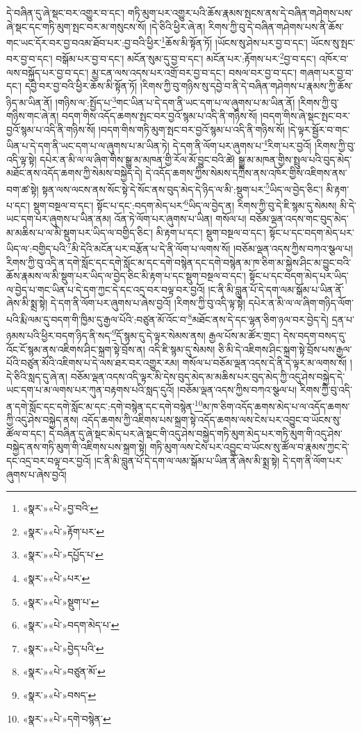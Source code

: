 དེ་བཞིན་དུ་ཞེ་སྡང་བར་འགྱུར་བ་དང་། གཏི་མུག་པར་འགྱུར་པའི་ཆོས་རྣམས་སྤངས་ནས་དེ་བཞིན་གཤེགས་པས་ཞེ་སྡང་དང་གཏི་མུག་སྤང་བར་མ་གསུངས་སོ། །དེ་ཅིའི་ཕྱིར་ཞེ་ན། རིགས་ཀྱི་བུ་དེ་བཞིན་གཤེགས་པས་ནི་ཆོས་གང་ཡང་དོར་བར་བྱ་བའམ་ཐོབ་པར་:བྱ་བའི་ཕྱིར་\footnote{«སྣར་»«པེ་»བྱ་བའི་}ཆོས་མི་སྟོན་ཏོ། །ཡོངས་སུ་ཤེས་པར་བྱ་བ་དང་། ཡོངས་སུ་སྤང་བར་བྱ་བ་དང་། བསྒོམ་པར་བྱ་བ་དང་། མངོན་སུམ་དུ་བྱ་བ་དང་། མངོན་པར་:རྟོགས་པར་\footnote{«སྣར་»«པེ་»རྟོག་པར་}བྱ་བ་དང་། འཁོར་བ་ལས་བསྐྱོད་པར་བྱ་བ་དང་། མྱ་ངན་ལས་འདས་པར་འགྲོ་བར་བྱ་བ་དང་། བསལ་བར་བྱ་བ་དང་། གཞག་པར་བྱ་བ་དང་། དབྱེ་བར་བྱ་བའི་ཕྱིར་ཆོས་མི་སྟོན་ཏོ། །རིགས་ཀྱི་བུ་གཉིས་སུ་དབྱེ་བ་ནི་དེ་བཞིན་གཤེགས་པ་རྣམས་ཀྱི་ཆོས་ཉིད་མ་ཡིན་ནོ། །གཉིས་ལ་:སྤྱོད་པ་\footnote{«སྣར་»«པེ་»དཔྱོད་པ་}གང་ཡིན་པ་དེ་དག་ནི་ཡང་དག་པ་ལ་ཞུགས་པ་མ་ཡིན་ནོ། །རིགས་ཀྱི་བུ་གཉིས་གང་ཞེ་ན། བདག་གིས་འདོད་ཆགས་སྤང་བར་བྱའོ་སྙམ་པ་འདི་ནི་གཉིས་སོ། །བདག་གིས་ཞེ་སྡང་སྤང་བར་བྱའོ་སྙམ་པ་འདི་ནི་གཉིས་སོ། །བདག་གིས་གཏི་མུག་སྤང་བར་བྱའོ་སྙམ་པ་འདི་ནི་གཉིས་སོ། །དེ་ལྟར་སྦྱོར་བ་གང་ཡིན་པ་དེ་དག་ནི་ཡང་དག་པ་ལ་ཞུགས་པ་མ་ཡིན་ཏེ། དེ་དག་ནི་ལོག་པར་ཞུགས་པ་\footnote{«སྣར་»«པེ་»པར་}རིག་པར་བྱའོ། །རིགས་ཀྱི་བུ་འདི་ལྟ་སྟེ། དཔེར་ན་མི་ལ་ལ་ཞིག་གིས་སྒྱུ་མ་མཁན་གྱི་རོལ་མོ་བྱུང་བའི་ཚེ། སྒྱུ་མ་མཁན་གྱིས་སྤྲུལ་པའི་བུད་མེད་མཐོང་ནས་འདོད་ཆགས་ཀྱི་སེམས་བསྐྱེད་དེ། དེ་འདོད་ཆགས་ཀྱིས་སེམས་དཀྲིས་ནས་འཁོར་གྱིས་འཇིགས་ནས་བག་ཚ་སྟེ། སྟན་ལས་ལངས་ནས་སོང་སྟེ་དེ་སོང་ནས་བུད་མེད་དེ་ཉིད་ལ་མི་:སྡུག་པར་\footnote{«སྣར་»«པེ་»སྡུག་པ་}ཡིད་ལ་བྱེད་ཅིང་། མི་རྟག་པ་དང་། སྡུག་བསྔལ་བ་དང་། སྟོང་པ་དང་:བདག་མེད་པར་\footnote{«སྣར་»«པེ་»བདག་མེད་པ་}ཡིད་ལ་བྱེད་ན། རིགས་ཀྱི་བུ་དེ་ཇི་སྙམ་དུ་སེམས། མི་དེ་ཡང་དག་པར་ཞུགས་པ་ཡིན་ནམ། འོན་ཏེ་ལོག་པར་ཞུགས་པ་ཡིན། གསོལ་པ། བཅོམ་ལྡན་འདས་གང་བུད་མེད་མ་མཆིས་པ་ལ་མི་སྡུག་པར་ཡིད་ལ་བགྱིད་ཅིང་། མི་རྟག་པ་དང་། སྡུག་བསྔལ་བ་དང་། སྟོང་པ་དང་བདག་མེད་པར་ཡིད་ལ་:བགྱིད་པའི་\footnote{«སྣར་»«པེ་»བྱེད་པའི་}མི་དེའི་མངོན་པར་བརྩོན་པ་དེ་ནི་ལོག་པ་ལགས་སོ། །བཅོམ་ལྡན་འདས་ཀྱིས་བཀའ་སྩལ་པ། རིགས་ཀྱི་བུ་འདི་ན་དགེ་སློང་དང་དགེ་སློང་མ་དང་དགེ་བསྙེན་དང་དགེ་བསྙེན་མ་ཁ་ཅིག་མ་སྐྱེས་ཤིང་མ་བྱུང་བའི་ཆོས་རྣམས་ལ་མི་སྡུག་པར་ཡིད་ལ་བྱེད་ཅིང་མི་རྟག་པ་དང་སྡུག་བསྔལ་བ་དང་། སྟོང་པ་དང་བདག་མེད་པར་ཡིད་ལ་བྱེད་པ་གང་ཡིན་པ་དེ་དག་ཀྱང་དེ་དང་འདྲ་བར་བལྟ་བར་བྱའོ། །ང་ནི་མི་བླུན་པོ་དེ་དག་ལམ་སྒོམ་པ་ཡིན་ནོ་ཞེས་མི་སྨྲ་སྟེ། དེ་དག་ནི་ལོག་པར་ཞུགས་པ་ཞེས་བྱའོ། །རིགས་ཀྱི་བུ་འདི་ལྟ་སྟེ། དཔེར་ན་མི་ལ་ལ་ཞིག་གཉིད་ལོག་པའི་རྨི་ལམ་དུ་བདག་གི་ཁྱིམ་དུ་རྒྱལ་པོའི་:བཙུན་མོ་འོང་བ་\footnote{«སྣར་»«པེ་»བཙུན་མོ་}མཐོང་ནས་དེ་དང་ལྷན་ཅིག་ཉལ་བར་བྱེད་དེ། དྲན་པ་ཉམས་པའི་ཕྱིར་བདག་ཉིད་ནི་སད་\footnote{«སྣར་»«པེ་»བསད་}དོ་སྙམ་དུ་དེ་ལྟར་སེམས་ནས། རྒྱལ་པོས་མ་ཚོར་གྲང་། དེས་བདག་བསད་དུ་འོང་ངོ་སྙམ་ནས་འཇིགས་ཤིང་སྐྲག་སྟེ་བྲོས་ན། འདི་ཇི་སྙམ་དུ་སེམས། ཅི་མི་དེ་འཇིགས་ཤིང་སྐྲག་སྟེ་བྲོས་པས་རྒྱལ་པོའི་བཙུན་མོའི་འཇིགས་པ་དེ་ལས་ཐར་བར་འགྱུར་རམ། གསོལ་པ་བཅོམ་ལྡན་འདས་དེ་ནི་དེ་ལྟར་མ་ལགས་སོ། །དེ་ཅིའི་སླད་དུ་ཞེ་ན། བཅོམ་ལྡན་འདས་འདི་ལྟར་མི་དེས་བུད་མེད་མ་མཆིས་པར་བུད་མེད་ཀྱི་འདུ་ཤེས་བསྐྱེད་དེ་ཡང་དག་པ་མ་ལགས་པར་ཀུན་བརྟགས་པའི་སླད་དུའོ། །བཅོམ་ལྡན་འདས་ཀྱིས་བཀའ་སྩལ་པ། རིགས་ཀྱི་བུ་འདི་ན་དགེ་སློང་དང་དགེ་སློང་མ་དང་:དགེ་བསྙེན་དང་དགེ་བསྙེན་\footnote{«སྣར་»«པེ་»དགེ་བསྙེན་}མ་ཁ་ཅིག་འདོད་ཆགས་མེད་པ་ལ་འདོད་ཆགས་ཀྱི་འདུ་ཤེས་བསྐྱེད་ནས། འདོད་ཆགས་ཀྱི་འཇིགས་པས་སྐྲག་སྟེ་འདོད་ཆགས་ལས་ངེས་པར་འབྱུང་བ་ཡོངས་སུ་ཚོལ་བ་དང་། དེ་བཞིན་དུ་ཞེ་སྡང་མེད་པར་ཞེ་སྡང་གི་འདུ་ཤེས་བསྐྱེད་གཏི་མུག་མེད་པར་གཏི་མུག་གི་འདུ་ཤེས་བསྐྱེད་ནས་གཏི་མུག་གི་འཇིགས་པས་སྐྲག་སྟེ། གཏི་མུག་ལས་ངེས་པར་འབྱུང་བ་ཡོངས་སུ་ཚོལ་བ་རྣམས་ཀྱང་དེ་དང་འདྲ་བར་བལྟ་བར་བྱའོ། །ང་ནི་མི་བླུན་པོ་དེ་དག་ལ་ལམ་སྒོམ་པ་ཡིན་ནོ་ཞེས་མི་སྨྲ་སྟེ། དེ་དག་ནི་ལོག་པར་ཞུགས་པ་ཞེས་བྱའོ། 